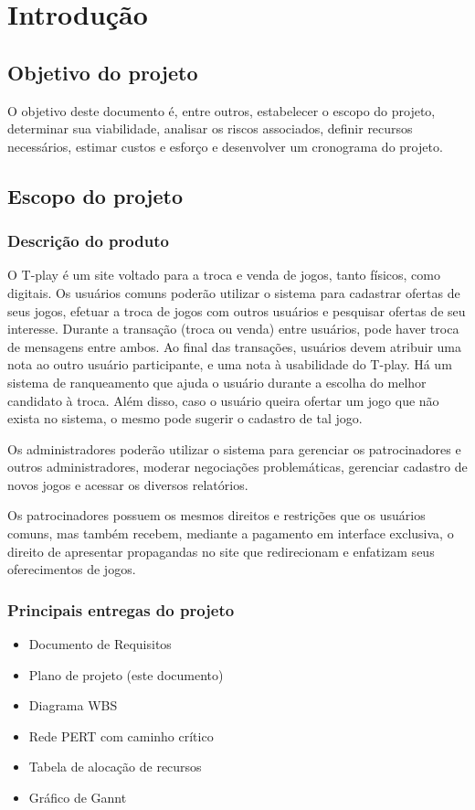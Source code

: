 \documentclass[a4paper,11pt]{article}
\begin{document}
\tableofcontents
\listoffigures
\listoftables
\newpage

\section{Introdução}
	\subsection{Objetivo do projeto}
		O objetivo deste documento é, entre outros, estabelecer o escopo do projeto, determinar sua viabilidade, analisar os riscos associados, definir recursos necessários, estimar custos e esforço e desenvolver um cronograma do projeto.

	\subsection{Escopo do projeto}
		\subsubsection{Descrição do produto}
			O T-play é  um site voltado para a troca e venda de jogos, tanto físicos, como digitais.
			Os usuários comuns poderão utilizar o sistema para cadastrar ofertas de seus jogos, efetuar a troca de jogos com outros usuários e 
pesquisar ofertas de seu interesse.
			Durante a transação (troca ou venda) entre usuários, pode haver troca de mensagens entre ambos.
			Ao final das transações, usuários devem atribuir uma nota ao outro usuário participante, e uma nota à usabilidade do T-play.
			Há um sistema de ranqueamento que ajuda o usuário durante a escolha do melhor candidato à troca.
			Além disso, caso o usuário queira ofertar um jogo que não exista no sistema, o mesmo pode sugerir o cadastro de tal jogo.
			
			Os administradores poderão utilizar o sistema para gerenciar os patrocinadores e outros administradores, moderar negociações problemáticas, gerenciar cadastro de novos jogos e acessar os diversos relatórios.

			Os patrocinadores possuem os mesmos direitos e restrições que os usuários comuns, mas também recebem, mediante a pagamento em interface exclusiva, o direito de apresentar propagandas no site que redirecionam e enfatizam seus oferecimentos de jogos.

		\subsubsection{Principais entregas do projeto}
			\begin{itemize}
				\item Documento de Requisitos
				\item Plano de projeto (este documento)
				\item Diagrama WBS
				\item Rede PERT com caminho crítico
				\item Tabela de alocação de recursos
				\item Gráfico de Gannt
			\end{itemize}
\end{document}
